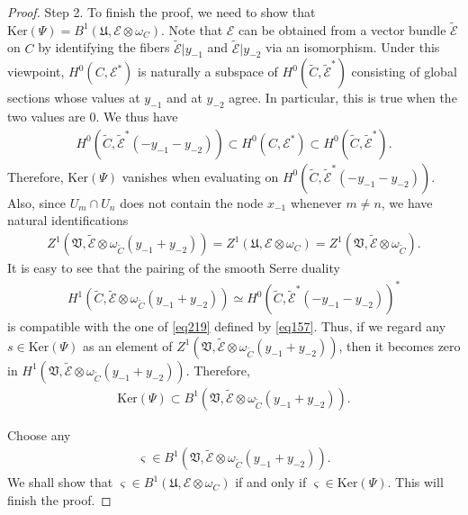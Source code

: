 \documentclass[12pt,a4paper,notitlepage]{report}
\theoremstyle{definition}
\theoremstyle{plain}
\newcommand{\fk}{\mathfrak}
\newcommand{\wtd}{\widetilde}
\newcommand{\scr}{\mathscr}
\newcommand{\sgm}{\varsigma}
\newcommand{\blt}{\bullet}
\newcommand{\Ker}{\mathrm{Ker}}
\numberwithin{equation}{section}
\begin{document}
\begin{proof}
Step 2. To finish the proof, we need to show that  $\Ker(\Psi)=B^1(\fk U,\scr E\otimes\omega_C)$. Note that $\scr E$ can be obtained from a vector bundle $\wtd{\scr E}$  on  $C$  by identifying the fibers $\wtd{\scr E}|y_{-1}$ and $\wtd{\scr E}|y_{-2}$ via an isomorphism. Under this viewpoint, $H^0(C,\scr E^*)$ is naturally a subspace of $H^0(\wtd C,\wtd{\scr E}^*)$ consisting of global sections whose values at $y_{-1}$ and at $y_{-2}$ agree. In particular, this is true when the two values are $0$. We thus have
\begin{align*}
H^0(\wtd C,\wtd{\scr E}^*(-y_{-1}-y_{-2}))\subset H^0(C,\scr E^*)\subset H^0(\wtd C,\wtd{\scr E}^*).
\end{align*}
Therefore, $\Ker(\Psi)$ vanishes when evaluating on $H^0(\wtd C,\wtd{\scr E}^*(-y_{-1}-y_{-2}))$. Also, since $U_m\cap U_n$ does not contain the node $x_{-1}$ whenever $m\neq n$, we have natural identifications
\begin{align*}
Z^1(\fk V,\wtd{\scr E}\otimes \omega_{\wtd C}(y_{-1}+y_{-2}))=Z^1(\fk U,\scr E\otimes \omega_C)=Z^1(\fk V,\wtd{\scr E}\otimes \omega_{\wtd C}).
\end{align*}
It is easy to see that the pairing of the smooth Serre duality
\begin{align}
H^1(\wtd C,\wtd{\scr E}\otimes\omega_{\wtd C}(y_{-1}+y_{-2}))\simeq H^0(\wtd C,\wtd{\scr E}^*(-y_{-1}-y_{-2}))^*\label{eq158}
\end{align}
is compatible with the one of \eqref{eq219} defined by \eqref{eq157}. Thus, if we regard any  $s\in\Ker(\Psi)$ as an element of $Z^1(\fk V,\wtd{\scr E}\otimes \omega_{\wtd C}(y_{-1}+y_{-2}))$, then it becomes zero in $H^1(\fk V,\wtd{\scr E}\otimes\omega_{\wtd C}(y_{-1}+y_{-2}))$. Therefore,
\begin{align*}
\Ker(\Psi)\subset B^1(\fk V,\wtd{\scr E}\otimes\omega_{\wtd C}(y_{-1}+y_{-2})).
\end{align*}

Choose any
\begin{align*}
\sgm\in B^1(\fk V,\wtd{\scr E}\otimes\omega_{\wtd C}(y_{-1}+y_{-2})).
\end{align*}
We shall show that $\sgm\in B^1(\fk U,\scr E\otimes\omega_C)$ if and only if $\sgm\in\Ker(\Psi)$. This will finish the proof.







\end{proof}
\end{document}
